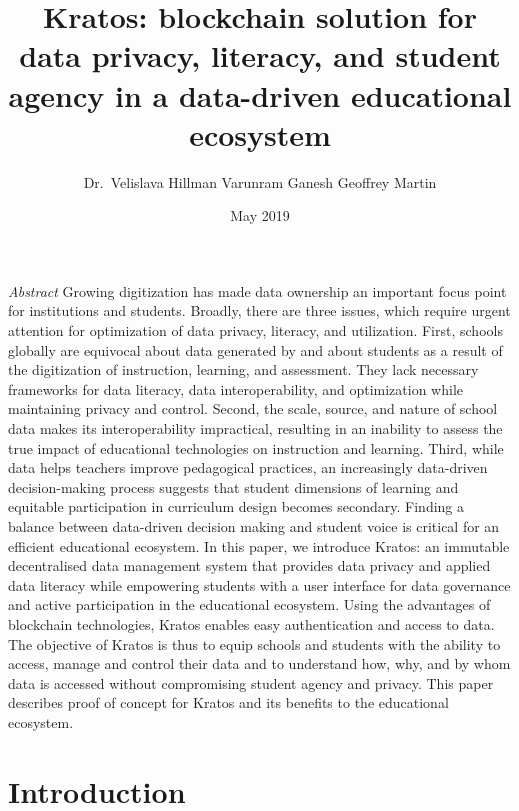 \documentclass{article}
\title{Kratos: blockchain solution for data privacy, literacy, and student agency in a data-driven educational ecosystem}
\author{Dr.\ Velislava Hillman \quad Varunram Ganesh \quad Geoffrey Martin}
\date{May 2019}
\begin{document}
\maketitle

\textit{Abstract}
Growing digitization has made data ownership an important focus point for institutions and students. Broadly, there are three issues, which require urgent attention for optimization of data privacy, literacy, and utilization. First, schools globally are equivocal about data generated by and about students as a result of the digitization of instruction, learning, and assessment. They lack necessary frameworks for data literacy, data interoperability, and optimization while maintaining privacy and control. Second, the scale, source, and nature of school data makes its interoperability impractical, resulting in an inability to assess the true impact of educational technologies on instruction and learning. Third, while data helps teachers improve pedagogical practices, an increasingly data-driven decision-making process suggests that student dimensions of learning and equitable participation in curriculum design becomes secondary. Finding a balance between data-driven decision making and student voice is critical for an efficient educational ecosystem. In this paper, we introduce Kratos: an immutable decentralised data management system that provides data privacy and applied data literacy while empowering students with a user interface for data governance and active participation in the educational ecosystem. Using the advantages of blockchain technologies, Kratos enables easy authentication and access to data. The objective of Kratos is thus to equip schools and students with the ability to access, manage and control their data and to understand how, why, and by whom data is accessed without compromising student agency and privacy. This paper describes proof of concept for Kratos and its benefits to the educational ecosystem.
\bigbreak

\section{Introduction}
\end{document}
